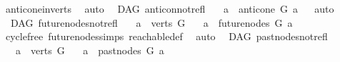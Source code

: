 \begin{isabellebody}
%
\isatagproof
{}\isamarkupfalse%
\ anticone{\isacharunderscore}{\kern0pt}in{\isacharunderscore}{\kern0pt}verts\ \isamarkupfalse%
\ auto%
\endisatagproof
{\isafoldproof}%
%
\isadelimproof
%
\endisadelimproof
\isanewline
\isanewline
{}\isamarkupfalse%
\ {\isacharparenleft}{\kern0pt}\ DAG{\isacharparenright}{\kern0pt}\ anticon{\isacharunderscore}{\kern0pt}not{\isacharunderscore}{\kern0pt}refl{\isacharcolon}{\kern0pt}\isanewline
\ \ \ {\isachardoublequoteopen}a\ {\isasymnotin}\ {\isacharparenleft}{\kern0pt}anticone\ G\ a{\isacharparenright}{\kern0pt}{\isachardoublequoteclose}%
\isadelimproof
\ %
\endisadelimproof
%
\isatagproof
{}\isamarkupfalse%
\ auto%
\endisatagproof
{\isafoldproof}%
%
\isadelimproof
%
\endisadelimproof
%
\isadelimdocument
%
\endisadelimdocument
%
\isatagdocument
%
\isamarkuptrue%
%
\endisatagdocument
{\isafolddocument}%
%
\isadelimdocument
%
\endisadelimdocument
{}\isamarkupfalse%
\ {\isacharparenleft}{\kern0pt}\ DAG{\isacharparenright}{\kern0pt}\ future{\isacharunderscore}{\kern0pt}nodes{\isacharunderscore}{\kern0pt}not{\isacharunderscore}{\kern0pt}refl{\isacharcolon}{\kern0pt}\isanewline
\ \ \ {\isachardoublequoteopen}a\ {\isasymin}\ verts\ G{\isachardoublequoteclose}\isanewline
\ \ \ {\isachardoublequoteopen}a\ {\isasymnotin}\ future{\isacharunderscore}{\kern0pt}nodes\ G\ a{\isachardoublequoteclose}\isanewline
%
\isadelimproof
\ \ %
\endisadelimproof
%
\isatagproof
{}\isamarkupfalse%
\ cycle{\isacharunderscore}{\kern0pt}free\ future{\isacharunderscore}{\kern0pt}nodes{\isachardot}{\kern0pt}simps\ reachable{\isacharunderscore}{\kern0pt}def\ \isamarkupfalse%
\ auto%
\endisatagproof
{\isafoldproof}%
%
\isadelimproof
%
\endisadelimproof
%
\isadelimdocument
%
\endisadelimdocument
%
\isatagdocument
%
\isamarkuptrue%
%
\endisatagdocument
{\isafolddocument}%
%
\isadelimdocument
%
\endisadelimdocument
{}\isamarkupfalse%
\ {\isacharparenleft}{\kern0pt}\ DAG{\isacharparenright}{\kern0pt}\ past{\isacharunderscore}{\kern0pt}nodes{\isacharunderscore}{\kern0pt}not{\isacharunderscore}{\kern0pt}refl{\isacharcolon}{\kern0pt}\isanewline
\ \ \ {\isachardoublequoteopen}a\ {\isasymin}\ verts\ G{\isachardoublequoteclose}\isanewline
\ \ \ {\isachardoublequoteopen}a\ {\isasymnotin}\ past{\isacharunderscore}{\kern0pt}nodes\ G\ a{\isachardoublequoteclose}\isanewline

\end{isabellebody}
